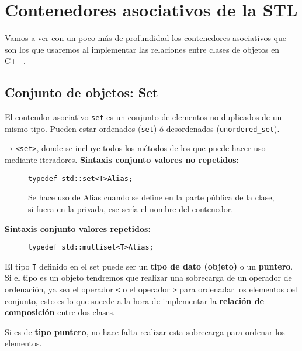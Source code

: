 \section{Contenedores asociativos de la STL}
Vamos a ver con un poco más de profundidad los contenedores asociativos que son los que usaremos al implementar las relaciones entre clases de objetos en C++.
\subsection{Conjunto de objetos: Set}
El contendor asociativo \texttt{set} es un conjunto de elementos no duplicados de un mismo tipo.
Pueden estar ordenados (\texttt{set}) ó desordenados (\texttt{unordered\_set}).

 →  \texttt{<set>}, donde se incluye todos los métodos de los que puede hacer uso mediante iteradores.
\newpage
\textbf{\large{Sintaxis conjunto valores no repetidos:}}
\begin{figure}[h]
  \begin{center}
    \begin{lstlisting}[frame = single]
                  typedef std::set<T>Alias;
    \end{lstlisting}
\end{center}
Se hace uso de Alias cuando se define en la parte pública de la clase, si fuera en la privada, ese sería el nombre
del contenedor.
\end{figure}

\textbf{\large{Sintaxis conjunto valores repetidos:}}
\begin{figure}[h]
  \begin{center}
    \begin{lstlisting}[frame=single]
                  typedef std::multiset<T>Alias;
    \end{lstlisting}
  \end{center}
\end{figure}

El tipo \textbf{\texttt{T}} definido en el set puede ser un \textbf{tipo de dato (objeto)} o un \textbf{puntero}. Si el tipo es un objeto tendremos que realizar
una sobrecarga de un operador de ordenación, ya sea el operador \texttt{<} o el operador \texttt{>} para ordenadar los elementos del conjunto,
esto es lo que sucede a la hora de implementar la \textbf{relación de composición} entre dos clases.

Si es de \textbf{ tipo puntero}, no hace falta realizar esta sobrecarga para ordenar los elementos.

